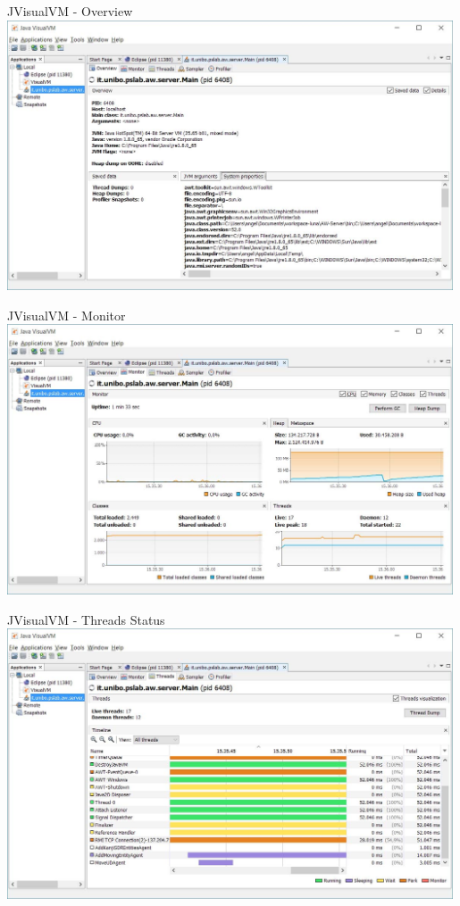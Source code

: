 \documentclass[presentation]{beamer}
\begin{document}
\begin{frame}{JVisualVM - Overview}
\centering
\includegraphics[width=0.99\textwidth]{img/jvisualvm-0}
\end{frame}

\begin{frame}{JVisualVM - Monitor}
\centering
\includegraphics[width=0.99\textwidth]{img/jvisualvm-1}
\end{frame}

\begin{frame}{JVisualVM - Threads Status}
\centering
\includegraphics[width=0.99\textwidth]{img/jvisualvm-2}
\end{frame}
\end{document}
